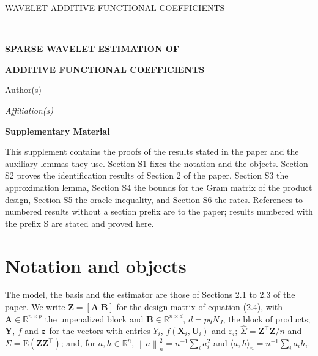 \documentclass[10pt]{book}
\theoremstyle{definition}
\newcommand{\R}{\mathbb{R}}
\newcommand{\E}{\mathrm{E}}
\newcommand{\T}{^{\top}}
\newcommand{\normn}[1]{\left\lVert #1 \right\rVert_{n}}
\newcommand{\inner}[2]{\langle #1, #2 \rangle}
\newcommand{\NJ}{N_{J}}
\newcommand{\bX}{\mathbf{X}}
\newcommand{\bU}{\mathbf{U}}
\newcommand{\bZ}{\mathbf{Z}}
\newcommand{\Gram}{\Sigma}
\newcommand{\Gramhat}{\widehat{\Sigma}}
\newcommand{\Amat}{\mathbf{A}}
\newcommand{\Bmat}{\mathbf{B}}
\newcommand{\bveps}{\boldsymbol{\varepsilon}}
\newcommand{\bY}{\mathbf{Y}}
\begin{document}
\renewcommand{\baselinestretch}{2}


{\hfill {\footnotesize\rm WAVELET ADDITIVE FUNCTIONAL COEFFICIENTS} \hfill}

\renewcommand{\thefootnote}{}
$\ $\par \fontsize{12}{14pt plus.8pt minus .6pt}\selectfont


\centerline{\large\bf SPARSE WAVELET ESTIMATION OF}
\vspace{2pt}
\centerline{\large\bf ADDITIVE FUNCTIONAL COEFFICIENTS}
\vspace{.25cm}
\centerline{Author(s)}
\vspace{.4cm}
\centerline{\it Affiliation(s)}
\vspace{.55cm}
\centerline{\bf Supplementary Material}
\vspace{.55cm}
\fontsize{9}{11.5pt plus.8pt minus .6pt}\selectfont
\noindent
This supplement contains the proofs of the results stated in the paper and
the auxiliary lemmas they use. Section S1 fixes the notation and the objects.
Section S2 proves the identification results of Section 2 of the paper,
Section S3 the approximation lemma, Section S4 the bounds for the Gram matrix
of the product design, Section S5 the oracle inequality, and Section S6 the
rates. References to numbered results without a section prefix are to the
paper; results numbered with the prefix S are stated and proved here.
\par

\setcounter{section}{0}
\setcounter{equation}{0}
\def\theequation{S\arabic{section}.\arabic{equation}}
\def\thesection{S\arabic{section}}

\fontsize{12}{14pt plus.8pt minus .6pt}\selectfont

\section{Notation and objects}

The model, the basis and the estimator are those of Sections 2.1 to 2.3 of the
paper. We write $\bZ = [\Amat\;\Bmat]$ for the design matrix of equation
(2.4), with $\Amat \in \R^{n\times p}$ the unpenalized block and
$\Bmat \in \R^{n\times d}$, $d = pq\NJ$, the block of products; $\bY$, $f$ and
$\bveps$ for the vectors with entries $Y_i$, $f(\bX_i,\bU_i)$ and
$\varepsilon_i$; $\Gramhat = \bZ\T\bZ/n$ and $\Gram = \E(\bZ\bZ\T)$; and, for
$a, h \in \R^n$, $\normn{a}^2 = n^{-1}\sum_i a_i^2$ and
$\inner{a}{h}_n = n^{-1}\sum_i a_ih_i$.
\end{document}
